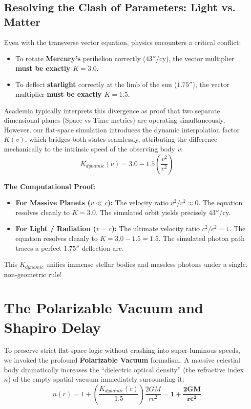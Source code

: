 \documentclass[reprint,amsmath,amssymb,aps,prd,twocolumn]{revtex4-2}
\begin{document}
\subsection{Resolving the Clash of Parameters: Light vs. Matter}

Even with the transverse vector equation, physics encounters a critical conflict:
\begin{itemize}
    \item To rotate \textbf{Mercury's} perihelion correctly ($43''$/cy), the vector multiplier \textbf{must be exactly $K = 3.0$}.
    \item To deflect \textbf{starlight} correctly at the limb of the sun ($1.75''$), the vector multiplier \textbf{must be exactly $K = 1.5$}.
\end{itemize}

Academia typically interprets this divergence as proof that two separate dimensional planes (Space vs Time metrics) are operating simultaneously. However, our flat-space simulation introduces the dynamic interpolation factor $K(v)$, which bridges both states seamlessly, attributing the difference mechanically to the intrinsic speed of the observing body $v$:
\begin{equation}
K_{dynamic}(v) = 3.0 - 1.5 \left( \frac{v^2}{c^2} \right)
\end{equation}

\textbf{The Computational Proof:}
\begin{itemize}
    \item \textbf{For Massive Planets ($v \ll c$):} The velocity ratio $v^2/c^2 \approx 0$. The equation resolves cleanly to $K = 3.0$. The simulated orbit yields precisely $43''$/cy.
    \item \textbf{For Light / Radiation ($v = c$):} The ultimate velocity ratio $c^2/c^2 = 1$. The equation resolves cleanly to $K = 3.0 - 1.5 = 1.5$. The simulated photon path traces a perfect $1.75''$ deflection arc.
\end{itemize}

This $K_{dynamic}$ unifies immense stellar bodies and massless photons under a single, non-geometric rule!

\section{The Polarizable Vacuum and Shapiro Delay}

To preserve strict flat-space logic without crashing into super-luminous speeds, we invoked the profound \textbf{Polarizable Vacuum} formalism. A massive celestial body dramatically increases the ``dielectric optical density'' (the refractive index $n$) of the empty spatial vacuum immediately surrounding it:
\begin{equation}
n(r) = 1 + \left(\frac{K_{dynamic}(c)}{1.5}\right) \frac{2GM}{rc^2} = \mathbf{1 + \frac{2GM}{rc^2}}
\end{equation}
\end{document}
